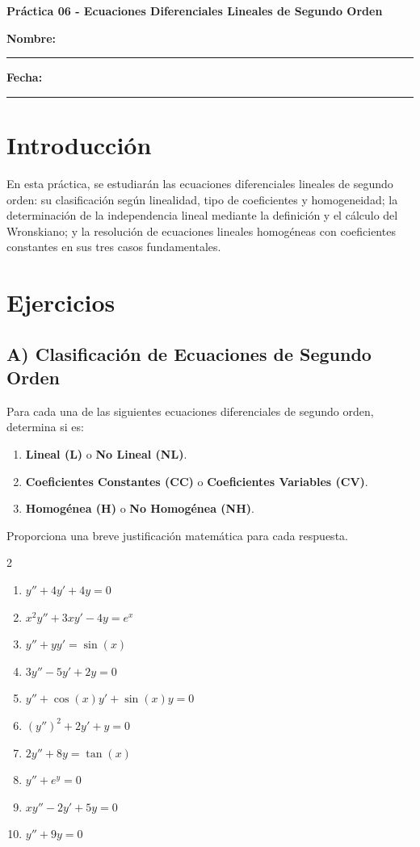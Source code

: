 \documentclass[a4paper,11pt]{article}
\begin{document}
\begin{center}
    \Large\textbf{Práctica 06 - Ecuaciones Diferenciales Lineales de Segundo Orden}\\[0.5cm]  

\end{center}
  \textbf{Nombre:} \rule{9cm}{0.4pt}  \textbf{Fecha:} \rule{4.5cm}{0.4pt}

\section*{Introducción}
En esta práctica, se estudiarán las ecuaciones diferenciales lineales de segundo orden: su clasificación según linealidad, tipo de coeficientes y homogeneidad; la determinación de la independencia lineal mediante la definición y el cálculo del Wronskiano; y la resolución de ecuaciones lineales homogéneas con coeficientes constantes en sus tres casos fundamentales.

\section*{Ejercicios}

\subsection*{A) Clasificación de Ecuaciones de Segundo Orden}
Para cada una de las siguientes ecuaciones diferenciales de segundo orden, determina si es:
\begin{enumerate}[label=(\alph*), itemsep=0.05cm]
    \item \textbf{Lineal (L)} o \textbf{No Lineal (NL)}.
    \item \textbf{Coeficientes Constantes (CC)} o \textbf{Coeficientes Variables (CV)}.
    \item \textbf{Homogénea (H)} o \textbf{No Homogénea (NH)}.
\end{enumerate}
Proporciona una breve justificación matemática para cada respuesta.

\begin{multicols}{2}
\begin{enumerate}[itemsep=0.1cm]
    \item $y'' + 4y' + 4y = 0$
    \item $x^2 y'' + 3x y' - 4y = e^x$
    \item $y'' + y y' = \sin(x)$
    \item $3 y'' - 5 y' + 2y = 0$
    \item $y'' + \cos(x) y' + \sin(x) y = 0$
    \item $(y'')^2 + 2 y' + y = 0$
    \item $2 y'' + 8 y = \tan(x)$
    \item $y'' + e^y = 0$
    \item $x y'' - 2 y' + 5y = 0$
    \item $y'' + 9y = 0$
\end{enumerate}
\end{multicols}
\end{document}
